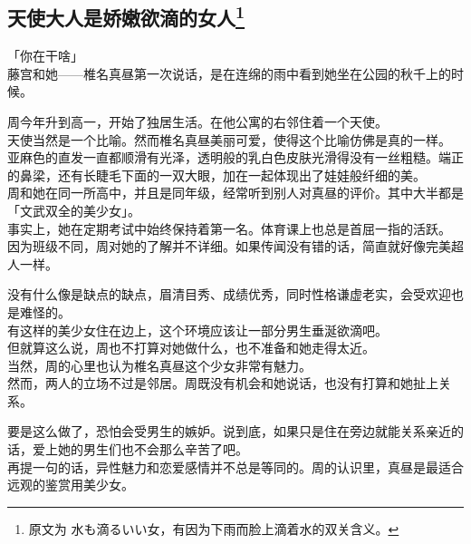 \subsection[天使大人是娇嫩欲滴的女人]{天使大人是娇嫩欲滴的女人\footnote{原文为 {\jpfont 水も滴るいい女}，有因为下雨而脸上滴着水的双关含义。}}

「你在干啥」\\

藤宫和她——椎名真昼第一次说话，是在连绵的雨中看到她坐在公园的秋千上的时候。\\

\vspace{2\baselineskip}

周今年升到高一，开始了独居生活。在他公寓的右邻住着一个天使。\\

天使当然是一个比喻。然而椎名真昼美丽可爱，使得这个比喻仿佛是真的一样。\\

亚麻色的直发一直都顺滑有光泽，透明般的乳白色皮肤光滑得没有一丝粗糙。端正的鼻梁，还有长睫毛下面的一双大眼，加在一起体现出了娃娃般纤细的美。\\

周和她在同一所高中，并且是同年级，经常听到别人对真昼的评价。其中大半都是「文武双全的美少女」。\\

事实上，她在定期考试中始终保持着第一名。体育课上也总是首屈一指的活跃。\\

因为班级不同，周对她的了解并不详细。如果传闻没有错的话，简直就好像完美超人一样。

没有什么像是缺点的缺点，眉清目秀、成绩优秀，同时性格谦虚老实，会受欢迎也是难怪的。\\

有这样的美少女住在边上，这个环境应该让一部分男生垂涎欲滴吧。\\

但就算这么说，周也不打算对她做什么，也不准备和她走得太近。\\

当然，周的心里也认为椎名真昼这个少女非常有魅力。\\

然而，两人的立场不过是邻居。周既没有机会和她说话，也没有打算和她扯上关系。

要是这么做了，恐怕会受男生的嫉妒。说到底，如果只是住在旁边就能关系亲近的话，爱上她的男生们也不会那么辛苦了吧。\\

再提一句的话，异性魅力和恋爱感情并不总是等同的。周的认识里，真昼是最适合远观的鉴赏用美少女。\\


